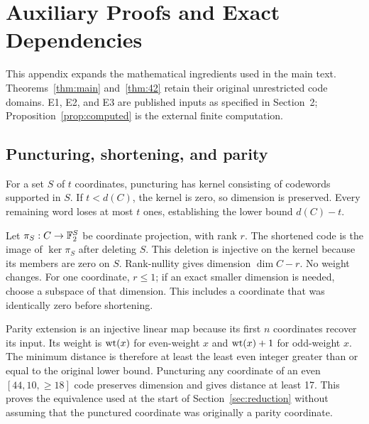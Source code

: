 \section{Auxiliary Proofs and Exact Dependencies}
\label{app:algebra}
This appendix expands the mathematical ingredients used in the main text. Theorems~\ref{thm:main} and~\ref{thm:42} retain their original unrestricted code domains. E1, E2, and E3 are published inputs as specified in Section~2; Proposition~\ref{prop:computed} is the external finite computation.

\subsection{Puncturing, shortening, and parity}
For a set $S$ of $t$ coordinates, puncturing has kernel consisting of codewords supported in $S$. If $t<d(C)$, the kernel is zero, so dimension is preserved. Every remaining word loses at most $t$ ones, establishing the lower bound $d(C)-t$.

Let $\pi_S:C\to\mathbb F_2^S$ be coordinate projection, with rank $r$. The shortened code is the image of $\ker\pi_S$ after deleting $S$. This deletion is injective on the kernel because its members are zero on $S$. Rank-nullity gives dimension $\dim C-r$. No weight changes. For one coordinate, $r\le1$; if an exact smaller dimension is needed, choose a subspace of that dimension. This includes a coordinate that was identically zero before shortening.

Parity extension is an injective linear map because its first $n$ coordinates recover its input. Its weight is $\operatorname{wt}(x)$ for even-weight $x$ and $\operatorname{wt}(x)+1$ for odd-weight $x$. The minimum distance is therefore at least the least even integer greater than or equal to the original lower bound. Puncturing any coordinate of an even $[44,10,\ge18]$ code preserves dimension and gives distance at least 17. This proves the equivalence used at the start of Section~\ref{sec:reduction} without assuming that the punctured coordinate was originally a parity coordinate.

